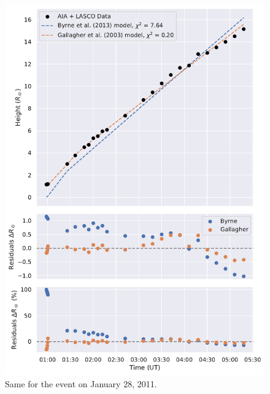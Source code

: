 \begin{figure}[!htp]
	\centering
	\includegraphics[width=0.8\hsize]{chapter2/figs/appendix/height_profile_residuals_aia_lasco_110128_01.pdf}
	\caption{Same for the event on January 28, 2011.}
\end{figure}

